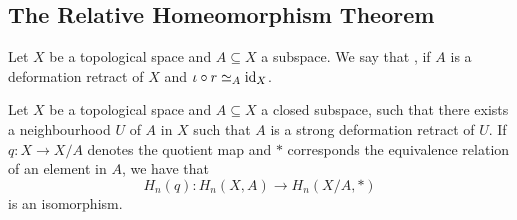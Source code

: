 \subsection*{The Relative Homeomorphism Theorem}

\begin{definition}
	Let $X$ be a topological space and $A \subseteq X$ a subspace. We say that , if $A$ is a deformation retract of $X$ and $\iota \circ r \simeq_A \operatorname{id}_X$.
\end{definition}

\begin{theorem}
	\label{thm:quotient}
	Let $X$ be a topological space and $A \subseteq X$ a closed subspace, such that there exists a neighbourhood $U$ of $A$ in $X$ such that $A$ is a strong deformation retract of $U$. If $q : X \to X/A$ denotes the quotient map and $\ast$ corresponds the equivalence relation of an element in $A$, we have that
	\begin{equation*}
		H_n(q) : H_n(X,A) \to H_n(X/A,\ast)
	\end{equation*}
	\noindent is an isomorphism.
\end{theorem}

